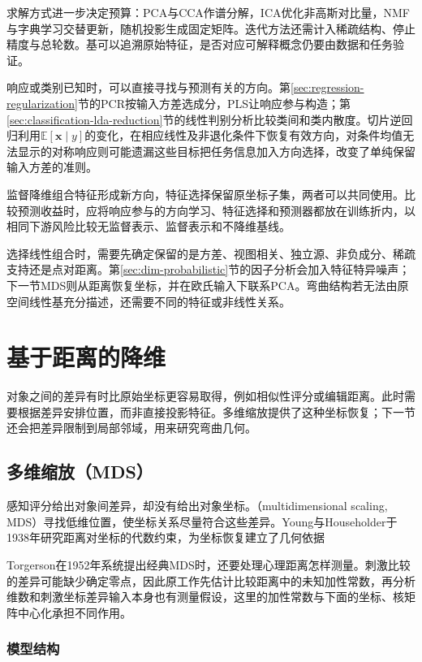 求解方式进一步决定预算：PCA与CCA作谱分解，ICA优化非高斯对比量，NMF与字典学习交替更新，随机投影生成固定矩阵。迭代方法还需计入稀疏结构、停止精度与总轮数。基可以追溯原始特征，是否对应可解释概念仍要由数据和任务验证。

响应或类别已知时，可以直接寻找与预测有关的方向。第\ref{sec:regression-regularization}节的PCR按输入方差选成分，PLS让响应参与构造；第\ref{sec:classification-lda-reduction}节的线性判别分析比较类间和类内散度。切片逆回归利用$\mathbb{E}[\bm{x}\mid y]$的变化，在相应线性及非退化条件下恢复有效方向，对条件均值无法显示的对称响应则可能遗漏这些目标把任务信息加入方向选择，改变了单纯保留输入方差的准则。

监督降维组合特征形成新方向，特征选择保留原坐标子集，两者可以共同使用。比较预测收益时，应将响应参与的方向学习、特征选择和预测器都放在训练折内，以相同下游风险比较无监督表示、监督表示和不降维基线。

选择线性组合时，需要先确定保留的是方差、视图相关、独立源、非负成分、稀疏支持还是点对距离。第\ref{sec:dim-probabilistic}节的因子分析会加入特征特异噪声；下一节MDS则从距离恢复坐标，并在欧氏输入下联系PCA。弯曲结构若无法由原空间线性基充分描述，还需要不同的特征或非线性关系。

\section{基于距离的降维}
\label{sec:dim-distance}

对象之间的差异有时比原始坐标更容易取得，例如相似性评分或编辑距离。此时需要根据差异安排位置，而非直接投影特征。多维缩放提供了这种坐标恢复；下一节还会把差异限制到局部邻域，用来研究弯曲几何。

\subsection{多维缩放（MDS）}
\label{sec:dim-mds}

感知评分给出对象间差异，却没有给出对象坐标。（multidimensional scaling, MDS）寻找低维位置，使坐标关系尽量符合这些差异。Young与Householder于1938年研究距离对坐标的代数约束，为坐标恢复建立了几何依据

Torgerson在1952年系统提出经典MDS时，还要处理心理距离怎样测量。刺激比较的差异可能缺少确定零点，因此原工作先估计比较距离中的未知加性常数，再分析维数和刺激坐标差异输入本身也有测量假设，这里的加性常数与下面的坐标、核矩阵中心化承担不同作用。

\subsubsection{模型结构}

